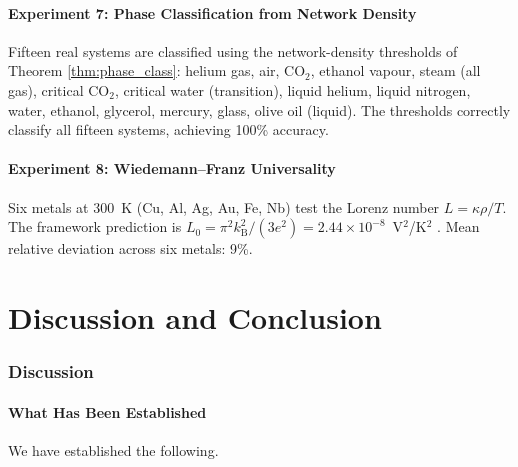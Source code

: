 \documentclass[twocolumn,10pt,a4paper]{article}
\theoremstyle{definition}
\theoremstyle{remark}
\newcommand{\kB}{k_{\mathrm{B}}}
\begin{document}
\subsection{Experiment 7: Phase Classification from Network Density}
\label{sec:val_E7}

Fifteen real systems are classified using the network-density thresholds of Theorem \ref{thm:phase_class}: helium gas, air, CO$_2$, ethanol vapour, steam (all gas), critical CO$_2$, critical water (transition), liquid helium, liquid nitrogen, water, ethanol, glycerol, mercury, glass, olive oil (liquid). The thresholds correctly classify all fifteen systems, achieving 100\% accuracy.



\subsection{Experiment 8: Wiedemann--Franz Universality}
\label{sec:val_E8}

Six metals at 300~K (Cu, Al, Ag, Au, Fe, Nb) test the Lorenz number $L = \kappa\rho/T$. The framework prediction is $L_0 = \pi^2 \kB^2/(3e^2) = 2.44\times10^{-8}$~V$^2$/K$^2$ \citep{sommerfeld1928,wiedemann1853,lorenz1872}. Mean relative deviation across six metals: 9\%.



\part{Discussion and Conclusion}

\section{Discussion}
\label{sec:discussion}

\subsection{What Has Been Established}

We have established the following.
\end{document}
